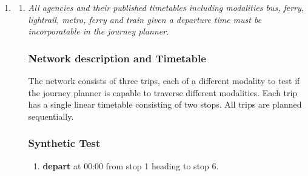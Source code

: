 \documentclass[a4paper,11pt]{article}
\author{Stefan de Konink & Joost Cassee}
\begin{document}
\begin{enumerate}
\item \begin{enumerate}
\item \textit{All agencies and their published timetables including modalities bus, ferry, lightrail, metro, ferry and train given a departure time must be incorporatable in the journey planner.}
\subsubsection*{Network description and Timetable}
The network consists of three trips, each of a different modality to test if the journey planner is capable to traverse different modalities.
Each trip has a single linear timetable consisting of two stops.
All trips are planned sequentially.

\begin{figure}[h]
\vspace{1em}
\raggedleft
\begin{minipage}{305pt}
\end{minipage}
\label{fig:modalities_network}
\vspace{-2em}
\end{figure}

\subsubsection*{Synthetic Test}
\begin{enumerate}
\item \textbf{depart} at 00:00 from stop 1 heading to stop 6.
\end{enumerate}


\end{enumerate}
\end{enumerate}
\end{document}
